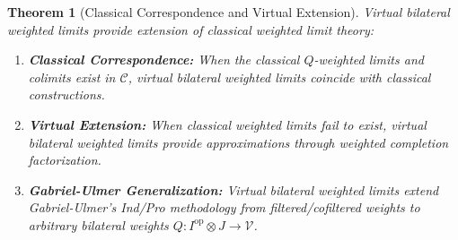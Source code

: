 \documentclass[11pt]{article}
\theoremstyle{plain}
\newtheorem{theorem}{Theorem}[section]
\theoremstyle{definition}
\theoremstyle{remark}
\newcommand{\V}{\mathcal{V}}
\newcommand{\C}{\mathcal{C}}
\newcommand{\op}{\mathrm{op}}
\begin{document}
\begin{theorem}[Classical Correspondence and Virtual Extension]\label{thm:virtual-correspondence}
Virtual bilateral weighted limits provide extension of classical weighted limit theory:

\begin{enumerate}
\item \textbf{Classical Correspondence:} When the classical $Q$-weighted limits and colimits exist in $\C$, virtual bilateral weighted limits coincide with classical constructions.

\item \textbf{Virtual Extension:} When classical weighted limits fail to exist, virtual bilateral weighted limits provide approximations through weighted completion factorization.

\item \textbf{Gabriel-Ulmer Generalization:} Virtual bilateral weighted limits extend Gabriel-Ulmer's Ind/Pro methodology from filtered/cofiltered weights to arbitrary bilateral weights $Q : I^{\op} \otimes J \to \V$.
\end{enumerate}
\end{theorem}
\end{document}
